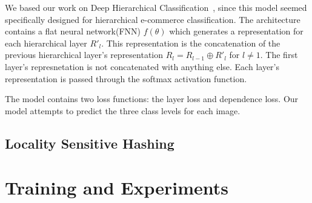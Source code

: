 \documentclass[conference]{IEEEtran}
\begin{document}
We based our work on Deep Hierarchical Classification~\cite{gao2020deep}, since this model seemed 
specifically designed for hierarchical e-commerce classification.
The architecture contains a flat neural network(FNN) $f(\theta)$ which generates a representation 
for each hierarchical layer $R'_l$. 
This representation is the concatenation of the previous hierarchical layer's representation
$R_l = R_{l-1}\oplus R'_l$ for $ l\neq 1$. 
The first layer's represnetation is not concatenated with anything else.
Each layer's representation is passed through the softmax activation function.

The model contains two loss functions: the layer loss and dependence loss.
Our model attempts to predict the three class levels for each image.

\subsection{Locality Sensitive Hashing}
\section{Training and Experiments}
 \printbibliography
\end{document}
